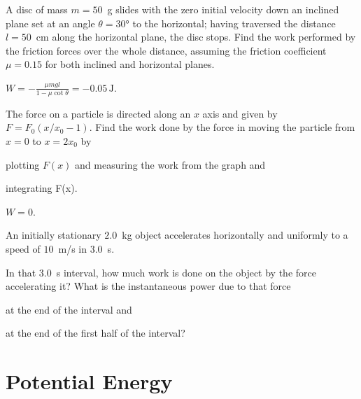 \begin{problem}
	A disc of mass $m = 50$~g slides with the zero initial velocity down an inclined plane set at an angle $\theta = \ang{30}$ to the horizontal; having traversed the distance $l = 50$~cm along the horizontal plane, the disc stops. Find the work performed by the friction forces over the whole distance, assuming the friction coefficient $\mu = 0.15$ for both inclined and horizontal planes.
	\begin{solution}
		$W = -\frac{\mu mg l}{1 - \mu \cot\theta} = -0.05\,\si{\joule}$.
	\end{solution}
\end{problem}

\begin{problem}
	The force on a particle is directed along an $x$ axis and given by $F = F_0(x/x_0 - 1)$. Find the work done by the force in moving the particle from $x = 0$ to $x = 2x_0$ by 
	\begin{enumerate*}[label=(\alph*)]
		\item plotting $F(x)$ and measuring the work from the graph and
		\item integrating F(x).
	\end{enumerate*}
	\begin{solution}
		$W = 0$.
	\end{solution}
\end{problem}


\begin{problem}
	An initially stationary $2.0$~kg object accelerates horizontally and uniformly to a speed of $10$~m/s in $3.0$~s.
	\begin{enumerate*}[label=(\alph*)]
		\item In that $3.0$~s interval, how much work is done on the object by the force accelerating it? What is the instantaneous power due to that force
		\item at the end of the interval and
		\item at the end of the first half of the interval?
	\end{enumerate*}
\end{problem}

\section{Potential Energy}


